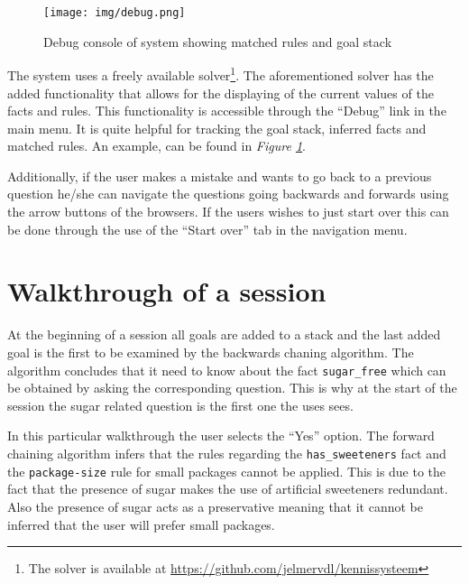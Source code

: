 \documentclass[11pt,a4paper]{article}
\begin{document}
\begin{figure}[!h]
	\centering
	\texttt{[image: img/debug.png]}
	\caption{Debug console of system showing matched rules and goal stack}
	\label{fig:debug}
\end{figure}

The system uses a freely available solver\footnote{The solver is available at \url{https://github.com/jelmervdl/kennissysteem}}. The aforementioned solver has the added functionality that allows for the displaying of the current values of the facts and rules. This functionality is accessible through the ``Debug'' link in the main menu. It is quite helpful for tracking the goal stack, inferred facts and matched rules. An example, can be found in \textit{Figure \ref{fig:debug}}. 

Additionally, if the user makes a mistake and wants to go back to a previous question he/she can navigate the questions going backwards and forwards using the arrow buttons of the browsers. If the users wishes to just start over this can be done through the use of the ``Start over'' tab in the navigation menu.

\section{Walkthrough of a session}

At the beginning of a session all goals are added to a stack and the last added goal is the first to be examined by the backwards chaning algorithm. The algorithm concludes that it need to know about the fact \verb|sugar_free| which can be obtained by asking the corresponding question. This is why at the start of the session the sugar related question is the first one the uses sees.

In this particular walkthrough the user selects the ``Yes'' option. The forward chaining algorithm infers that the rules regarding the \verb|has_sweeteners| fact and the \verb|package-size| rule for small packages cannot be applied. This is due to the fact that the presence of sugar makes the use of artificial sweeteners redundant. Also the presence of sugar acts as a preservative meaning that it cannot be inferred that the user will prefer small packages.
\end{document}
